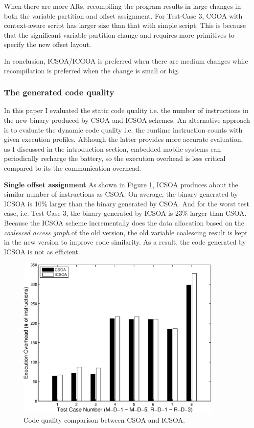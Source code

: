 When there are more ARs, recompiling the program results in large changes in both the variable
partition and offset assignment. For Test-Case 3, CGOA with context-aware script has larger size than that with simple script. This is because that the significant variable partition change and requires more primitives to specify the new offset layout. 

In conclusion, ICSOA/ICGOA is preferred when there are medium changes while recompilation is preferred when the change is small or big.

\subsubsection{The generated code quality}
In this paper I evaluated the static code quality i.e. the number of instructions in the new binary produced by CSOA and ICSOA schemes. An alternative approach is to evaluate the dynamic code quality i.e. the runtime instruction counts with given execution profiles. Although the latter provides more accurate evaluation, as I discussed in the introduction section, embedded mobile systems can periodically recharge the battery, so the execution overhead is less critical compared to its the communication overhead.

\textbf{Single offset assignment}
As shown in Figure \ref{exetotal}, ICSOA produces about the similar number of instructions as CSOA. On average, the binary generated by ICSOA is 10\% larger than the binary generated by CSOA. And for the worst test case, i.e. Test-Case 3, the binary generated by ICSOA is 23\% larger than CSOA. Because the ICSOA scheme incrementally does the data allocation based on the {\it coalesced access graph} of the old version, the old variable coalescing result is kept in the new version to improve code similarity. As a result, the code generated by ICSOA is not as efficient. 

\begin{figure}[htbp]
\begin{center}
\includegraphics[width=4in]{./figures/exe.eps}
\caption{Code quality comparison between CSOA and ICSOA.}
\label{exetotal}
\end{center}
\vspace{-0.2in}
\end{figure}


